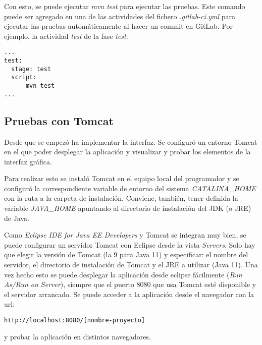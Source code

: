 Con esto, se puede ejecutar \textit{mvn test} para ejecutar las pruebas. Este comando puede ser agregado en una de las actividades del fichero \textit{.gitlab-ci.yml} para ejecutar las pruebas automáticamente al hacer un commit en GitLab. Por ejemplo, la actividad \textit{test} de la fase \textit{test}:\\
\begin{minipage}{\linewidth}
{\tiny
\begin{lstlisting}[breaklines]
...
test:
  stage: test
  script:
	- mvn test
...
\end{lstlisting}
}
\end{minipage}

\subsection{Pruebas con Tomcat}

Desde que se empezó ha implementar la interfaz. Se configuró un entorno Tomcat en el que poder desplegar la aplicación y visualizar y probar los elementos de la interfaz gráfica.

Para realizar esto se instaló Tomcat en el equipo local del programador y se configuró la correspondiente variable de entorno del sistema \textit{CATALINA\_HOME} con la ruta a la carpeta de instalación. Conviene, también, tener definida la variable \textit{JAVA\_HOME} apuntando al directorio de instalación del JDK (o JRE) de Java.

Como \textit{Eclipse IDE for Java EE Developers} y Tomcat se integran muy bien, se puede configurar un servidor Tomcat con Eclipse desde la vista \textit{Servers}. Solo hay que elegir la versión de Tomcat (la 9 para Java 11) y especificar: el nombre del servidor, el directorio de instalación de Tomcat y el JRE a utilizar (Java 11). Una vez hecho esto se puede desplegar la aplicación desde eclipse fácilmente (\textit{Run As/Run on Server}), siempre que el puerto 8080 que usa Tomcat esté disponible y el servidor arrancado. Se puede acceder a la aplicación desde el navegador con la url: 
\begin{minipage}{\linewidth}
{\tiny
\begin{lstlisting}[breaklines]
http://localhost:8080/[nombre-proyecto]
\end{lstlisting}
}
\end{minipage}
y probar la aplicación en distintos navegadores.

